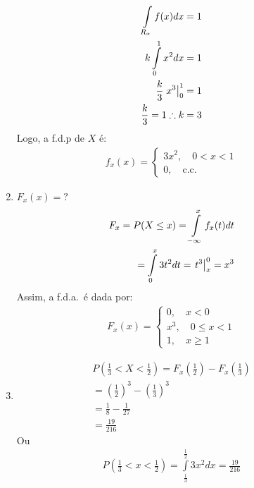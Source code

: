 \begin{description}
\begin{enumerate}[label=(\alph*)]
           \begin{align*}
             \int \limits_{R_x} f(x) dx =1 \\
             k \int \limits_{0}^{1} x^2 dx = 1 \\
             \frac{k}{3} \left.x^3\right\rvert_{0}^{1} = 1 \\
             \frac{k}{3}=1 \therefore k=3
           \end{align*}
           Logo, a f.d.p de $X$ é:
           \begin{align*}
             f_x(x)= \begin{cases}
               3x^2, \quad 0<x<1 \\
               0 , \quad \text{c.c.\ }
             \end{cases}
           \end{align*}
         \item  ${F}_{x} (x)= ?$
           \begin{align*}
             F_{x}= P(X \leq x)= \int \limits_{-\infty}^{x} f_{x} (t) dt \\
             = \int \limits^{x}_{0} 3 t^2 dt
             = \left.t^3\right\rvert_{{x}}^{{0}}= x^3
           \end{align*}
           Assim, a f.d.a.\ é dada por:
           \begin{align*}
             F_x(x)= \begin{cases}
               0 , \quad  x<0\\
               x^3, \quad 0 \leq x<1 \\
               1 , \quad x \geq 1 
             \end{cases}
           \end{align*}
         \item 
           \begin{align*}
             P\left( \frac{1}{3}< X < \frac{1}{2} \right)= F_{x} \left(\frac{1}{2}\right) - F_{x} \left(\frac{1}{3}\right)\\
             = \left(\frac{1}{2}\right)^3 - \left(\frac{1}{3}\right)^3 \\
             = \frac{1}{8} - \frac{1}{27}\\
             = \frac{19}{216}
           \end{align*}
           Ou 
           \begin{align*}
             P \left( \frac{1}{3} < x < \frac{1}{2} \right)= \int \limits_{\frac{1}{3}}^{\frac{1}{2}} 3x^2 dx = \frac{19}{216}
             \end{align*}

\end{enumerate}
\end{description}
